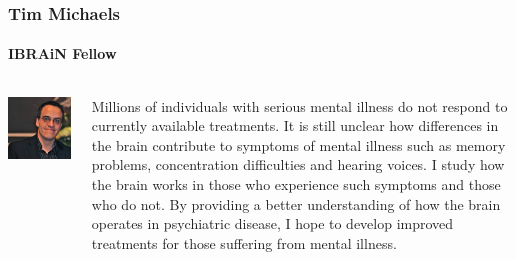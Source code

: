 \documentclass[aspectratio=169]{beamer}
\begin{document}
\begin{frame}
	\frametitle{Tim Michaels}
	\framesubtitle{IBRAiN Fellow}

	\begin{columns}[T]
		\begin{column}{.25\textwidth}
			\includegraphics[width=\textwidth]{img/ProfileTM.jpg}
		\end{column}

		\begin{column}{.75\textwidth}
			Millions of individuals with serious mental illness do not respond to currently available treatments. It is still unclear how differences in the brain contribute to symptoms of mental illness such as memory problems, concentration difficulties and hearing voices. I study how the brain works in those who experience such symptoms and those who do not. By providing a better understanding of how the brain operates in psychiatric disease, I hope to develop improved treatments for those suffering from mental illness. 

		\end{column}
	\end{columns}
\end{frame}
\end{document}
